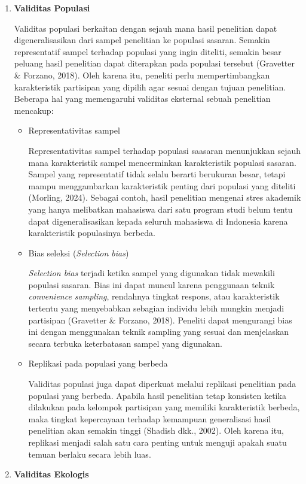 \documentclass[
  indonesian,
  letterpaper,
  DIV=11,
  numbers=noendperiod]{scrreprt}
\begin{document}
\begin{enumerate}
\def\labelenumi{\arabic{enumi}.}
\item
  \textbf{Validitas Populasi}

  Validitas populasi berkaitan dengan sejauh mana hasil penelitian dapat
  digeneralisasikan dari sampel penelitian ke populasi sasaran. Semakin
  representatif sampel terhadap populasi yang ingin diteliti, semakin
  besar peluang hasil penelitian dapat diterapkan pada populasi tersebut
  (Gravetter \& Forzano, 2018). Oleh karena itu, peneliti perlu
  mempertimbangkan karakteristik partisipan yang dipilih agar sesuai
  dengan tujuan penelitian. Beberapa hal yang memengaruhi validitas
  eksternal sebuah penelitian mencakup:

  \begin{itemize}
  \item
    Representativitas sampel

    Representativitas sampel terhadap populasi saasaran menunjukkan
    sejauh mana karakteristik sampel mencerminkan karakteristik populasi
    sasaran. Sampel yang representatif tidak selalu berarti berukuran
    besar, tetapi mampu menggambarkan karakteristik penting dari
    populasi yang diteliti (Morling, 2024). Sebagai contoh, hasil
    penelitian mengenai stres akademik yang hanya melibatkan mahasiswa
    dari satu program studi belum tentu dapat digeneralisasikan kepada
    seluruh mahasiswa di Indonesia karena karakteristik populasinya
    berbeda.
  \item
    Bias seleksi (\emph{Selection bias})

    \emph{Selection bias} terjadi ketika sampel yang digunakan tidak
    mewakili populasi sasaran. Bias ini dapat muncul karena penggunaan
    teknik \emph{convenience sampling}, rendahnya tingkat respons, atau
    karakteristik tertentu yang menyebabkan sebagian individu lebih
    mungkin menjadi partisipan (Gravetter \& Forzano, 2018). Peneliti
    dapat mengurangi bias ini dengan menggunakan teknik sampling yang
    sesuai dan menjelaskan secara terbuka keterbatasan sampel yang
    digunakan.
  \item
    Replikasi pada populasi yang berbeda

    Validitas populasi juga dapat diperkuat melalui replikasi penelitian
    pada populasi yang berbeda. Apabila hasil penelitian tetap konsisten
    ketika dilakukan pada kelompok partisipan yang memiliki
    karakteristik berbeda, maka tingkat kepercayaan terhadap kemampuan
    generalisasi hasil penelitian akan semakin tinggi (Shadish dkk.,
    2002). Oleh karena itu, replikasi menjadi salah satu cara penting
    untuk menguji apakah suatu temuan berlaku secara lebih luas.
  \end{itemize}
\item
  \textbf{Validitas Ekologis}


\end{enumerate}
\end{document}
